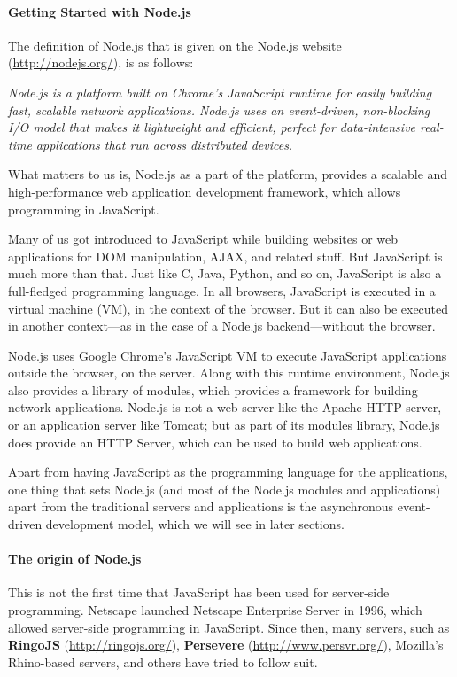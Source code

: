 \paragraph*{Getting Started with Node.js}
\hfill \break
The definition of Node.js that is given on the Node.js website
(\href{http://nodejs.org/}{http://nodejs.org/}), is as follows:
\begin{sloppypar}
\textit{Node.js is a platform built on Chrome's JavaScript runtime for easily building
fast, scalable network applications. Node.js uses an event-driven, non-blocking I/O
model that makes it lightweight and efficient, perfect for data-intensive real-time
applications that run across distributed devices.}
\end{sloppypar}
What matters to us is, Node.js as a part of the platform, provides a scalable and
high-performance web application development framework, which allows
programming in JavaScript.

Many of us got introduced to JavaScript while building websites or web applications
for DOM manipulation, AJAX, and related stuff. But JavaScript is much more
than that. Just like C, Java, Python, and so on, JavaScript is also a full-fledged
programming language. In all browsers, JavaScript is executed in a virtual
machine (VM), in the context of the browser. But it can also be executed in
another context—as in the case of a Node.js backend—without the browser.

Node.js uses Google Chrome's JavaScript VM to execute JavaScript applications
outside the browser, on the server. Along with this runtime environment,
Node.js also provides a library of modules, which provides a framework for
building network applications. Node.js is not a web server like the Apache HTTP
server, or an application server like Tomcat; but as part of its modules library,
Node.js does provide an HTTP Server, which can be used to build web applications.

Apart from having JavaScript as the programming language for the applications,
one thing that sets Node.js (and most of the Node.js modules and applications)
apart from the traditional servers and applications is the asynchronous event-driven
development model, which we will see in later sections.

\paragraph*{The origin of Node.js}
\hfill \break
This is not the first time that JavaScript has been used for server-side programming.
Netscape launched Netscape Enterprise Server in 1996, which allowed server-side
programming in JavaScript. Since then, many servers, such as \textbf{RingoJS}
(\href{http://ringojs.org/}{http://ringojs.org/}), \textbf{Persevere} (\href{http://www.persvr.org/}{http://www.persvr.org/}), Mozilla's
Rhino-based servers, and others have tried to follow suit.

